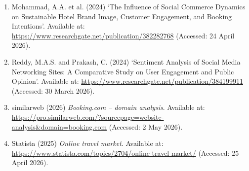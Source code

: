 \documentclass[12pt,a4paper]{ctexart}
\begin{document}
\begin{enumerate}[leftmargin=1.5em]
    \item Mohammad, A.A. et al. (2024) `The Influence of Social Commerce Dynamics on Sustainable Hotel Brand Image, Customer Engagement, and Booking Intentions'. Available at: \url{https://www.researchgate.net/publication/382282768} (Accessed: 24 April 2026).
    \item Reddy, M.A.S. and Prakash, C. (2024) `Sentiment Analysis of Social Media Networking Sites: A Comparative Study on User Engagement and Public Opinion'. Available at: \url{https://www.researchgate.net/publication/384199911} (Accessed: 30 March 2026).
    \item similarweb (2026) \textit{Booking.com -- domain analysis}. Available at: \url{https://pro.similarweb.com/?sourcepage=website-analysis&domain=booking.com} (Accessed: 2 May 2026).
    \item Statista (2025) \textit{Online travel market}. Available at: \url{https://www.statista.com/topics/2704/online-travel-market/} (Accessed: 25 April 2026).
\end{enumerate}
\end{document}
